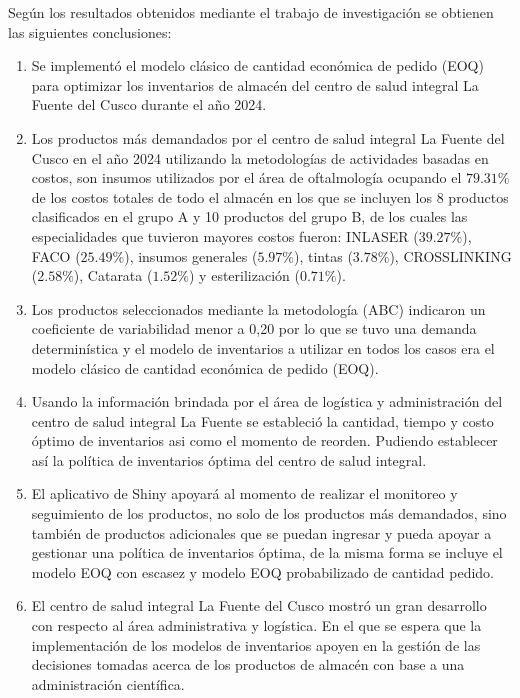 \begin{conclusiones}
	
Según los resultados obtenidos mediante el trabajo de investigación se obtienen las siguientes conclusiones:

\begin{enumerate}
\item Se implementó el modelo clásico de cantidad económica de pedido (EOQ) para optimizar los inventarios de almacén del centro de salud integral La Fuente del Cusco durante el año 2024.
\item Los productos más demandados por el centro de salud integral La Fuente del Cusco en el año 2024 utilizando la metodologías de actividades basadas en costos, son insumos utilizados por el área de oftalmología ocupando el $79.31\%$ de los costos totales de todo el almacén en los que se incluyen los 8 productos clasificados en el grupo A y 10 productos del grupo B, de los cuales las especialidades que tuvieron mayores costos fueron: INLASER ($39.27\%$), FACO ($25.49\%$), insumos generales ($5.97\%$), tintas ($3.78\%$), CROSSLINKING ($2.58\%$), Catarata ($1.52\%$) y esterilización ($0.71\%$). 
\item Los productos seleccionados mediante la metodología (ABC) indicaron un coeficiente de variabilidad menor a 0,20 por lo que se tuvo una demanda determinística y el modelo de inventarios a utilizar en todos los casos era el modelo clásico de cantidad económica de pedido (EOQ).
\item Usando la información brindada por el área de logística y administración del centro de salud integral La Fuente se estableció la cantidad, tiempo y costo óptimo de inventarios asi como el momento de reorden. Pudiendo establecer así la política de inventarios óptima del centro de salud integral.
\item El aplicativo de Shiny apoyará al momento de realizar el monitoreo y seguimiento de los productos, no solo de los productos más demandados, sino también de productos adicionales que se puedan ingresar y pueda apoyar a gestionar una política de inventarios óptima, de la misma forma se incluye el modelo EOQ con escasez y modelo EOQ probabilizado de cantidad pedido.
\item El centro de salud integral La Fuente del Cusco mostró un gran desarrollo con respecto al área administrativa y logística. En el que se espera que la implementación de los modelos de inventarios apoyen en la gestión de las decisiones tomadas acerca de los productos de almacén con base a una administración científica.

\end{enumerate}
	
\end{conclusiones}
